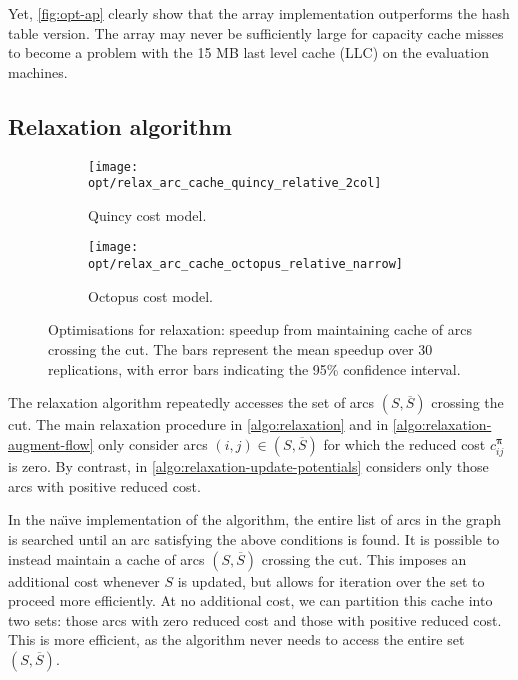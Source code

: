 Yet, \cref{fig:opt-ap} clearly show that the array implementation outperforms the hash table version. The array may never be sufficiently large for capacity cache misses to become a problem with the 15 MB last level cache (LLC) on the evaluation machines.

\subsection{Relaxation algorithm}

\begin{figure}
    \centering
    \begin{subfigure}[c]{0.49\textwidth}
        \texttt{[image: opt/relax\_arc\_cache\_quincy\_relative\_2col]}
        \caption{Quincy cost model.}
    \end{subfigure}
    \begin{subfigure}[c]{0.49\textwidth}
        \centering
        \texttt{[image: opt/relax\_arc\_cache\_octopus\_relative\_narrow]}
        \caption{Octopus cost model.}
    \end{subfigure}
    \caption[Optimisations for relaxation]{Optimisations for relaxation: speedup from maintaining cache of arcs crossing the cut. The bars represent the mean speedup over 30 replications, with error bars indicating the 95\% confidence interval.}
    \label{fig:opt-relax-cache-arcs}
\end{figure}

The relaxation algorithm repeatedly accesses the set of arcs $\left(S,\overline{S}\right)$ crossing the cut. The main relaxation procedure in \cref{algo:relaxation} and  in \cref{algo:relaxation-augment-flow} only consider arcs $(i,j) \in \left(S,\overline{S}\right)$ for which the reduced cost $c_{ij}^{\boldsymbol{\pi}}$ is zero. By contrast,  in \cref{algo:relaxation-update-potentials} considers only those arcs with positive reduced cost.

In the na\"{\i}ve implementation of the algorithm, the entire list of arcs in the graph is searched until an arc satisfying the above conditions is found. It is possible to instead maintain a cache of arcs $\left(S,\overline{S}\right)$ crossing the cut. This imposes an additional cost whenever $S$ is updated, but allows for iteration over the set to proceed more efficiently. At no additional cost, we can partition this cache into two sets: those arcs with zero reduced cost and those with positive reduced cost\footnotemark. This is more efficient, as the algorithm never needs to access the entire set $\left(S,\overline{S}\right)$.

